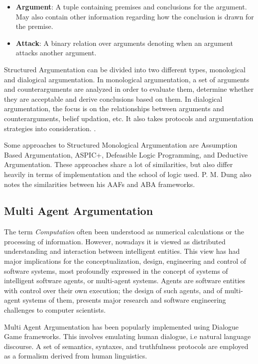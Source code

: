 \documentclass[sigconf]{acmart}
\begin{document}
\begin{itemize}
  \item \textbf{Argument}: A tuple containing premises and conclusions for the argument. May also contain other information regarding how the conclusion is drawn for the premise.
  \item \textbf{Attack}: A binary relation over arguments denoting when an argument attacks another argument.
\end{itemize}

Structured Argumentation can be divided into two different types, monological and dialogical argumentation. In monological argumentation, a set of arguments and counterarguments are analyzed in order to evaluate them, determine whether they are acceptable and derive conclusions based on them. In dialogical argumentation, the focus is on the relationships between arguments and counterarguments, belief updation, etc. It also takes protocols and argumentation strategies into consideration. \cite{besnard}.

Some approaches to Structured Monological Argumentation are Assumption Based Argumentation, ASPIC+, Defeasible Logic Programming, and Deductive Argumentation. These approaches share a lot of similarities, but also differ heavily in terms of implementation and the school of logic used. P. M. Dung also notes the similarities between his AAFs and ABA frameworks.


\subsection{Multi Agent Argumentation}
The term \textit{Computation} often been understood as numerical calculations or the processing of information. However, nowadays it is viewed as distributed understanding and interaction between intelligent entities. This view has had major implications for the conceptualization, design, engineering and control of software systems, most profoundly expressed in the concept of systems of intelligent software agents, or multi-agent systems. Agents are software entities with control over their own execution; the design of such agents, and of multi-agent systems of them, presents major research and software engineering challenges to computer scientists.\cite{rahwan2009argumentation}


Multi Agent Argumentation has been popularly implemented using Dialogue Game frameworks. This involves emulating human dialogue, i.e natural language discourse. A set of semantics, syntaxes, and truthfulness protocols are employed as a formalism derived from human linguistics.
\end{document}
